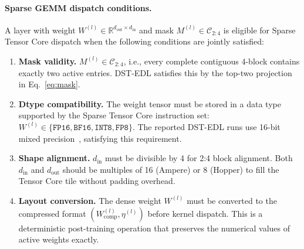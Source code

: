 \paragraph{Sparse GEMM dispatch conditions.}
A layer with weight $W^{(l)}\in\mathbb{R}^{d_{\mathrm{out}}\times
d_{\mathrm{in}}}$ and mask $M^{(l)}\in\mathcal{C}_{2:4}$ is eligible for
Sparse Tensor Core dispatch when the following conditions are jointly
satisfied:
\begin{enumerate}[leftmargin=*,itemsep=1pt,parsep=0pt]
    \item \textbf{Mask validity.} $M^{(l)}\in\mathcal{C}_{2:4}$, i.e., every
          complete contiguous 4-block contains exactly two active entries.
          DST-EDL satisfies this by the top-two projection in
          Eq.~\ref{eq:mask}.
    \item \textbf{Dtype compatibility.} The weight tensor must be stored in a
          data type supported by the Sparse Tensor Core instruction set:
          $W^{(l)}\in\{\texttt{FP16},\texttt{BF16},\texttt{INT8},\texttt{FP8}\}$.
          The reported DST-EDL runs use 16-bit mixed
          precision~\cite{micikevicius2018mixed}, satisfying this requirement.
    \item \textbf{Shape alignment.} $d_{\mathrm{in}}$ must be divisible by 4
          for 2:4 block alignment. Both $d_{\mathrm{in}}$ and
          $d_{\mathrm{out}}$ should be multiples of 16 (Ampere) or 8 (Hopper)
          to fill the Tensor Core tile without padding overhead.
    \item \textbf{Layout conversion.} The dense weight $W^{(l)}$ must be
          converted to the compressed format
          $(W_{\mathrm{comp}}^{(l)},\eta^{(l)})$ before kernel dispatch. This
          is a deterministic post-training operation that preserves the
          numerical values of active weights exactly.
\end{enumerate}

